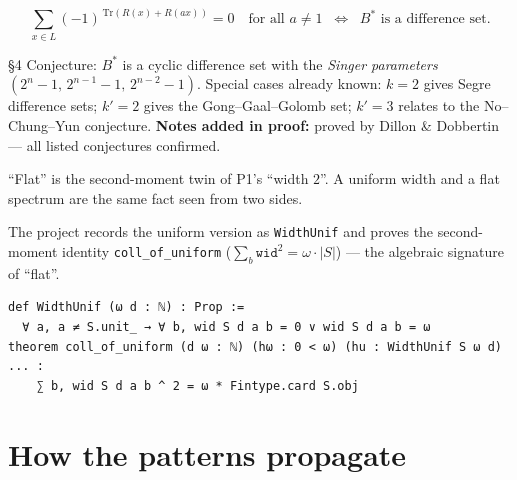 \documentclass[11pt]{article}
\begin{document}
\[
  \sum_{x\in L} (-1)^{\,\mathrm{Tr}(R(x)+R(ax))} = 0
  \quad\text{for all } a\ne 1
  \;\;\Longleftrightarrow\;\;
  B^{*}\text{ is a difference set.}
\]

\begin{center}
\end{center}

\begin{remarkbox}
{\S}4 Conjecture: $B^{*}$ is a cyclic difference set with the \emph{Singer
parameters} $(2^n-1,\,2^{n-1}-1,\,2^{n-2}-1)$. Special cases already known:
$k=2$ gives Segre difference sets; $k'=2$ gives the Gong--Gaal--Golomb set;
$k'=3$ relates to the No--Chung--Yun conjecture. \textbf{Notes added in proof:}
proved by Dillon \& Dobbertin --- all listed conjectures confirmed.
\end{remarkbox}

\begin{coolfact}
``Flat'' is the second-moment twin of P1's ``width $2$''. A uniform width and a
flat spectrum are the same fact seen from two sides.
\end{coolfact}

\begin{leanbox}
The project records the uniform version as \texttt{WidthUnif} and proves the
second-moment identity \texttt{coll\_of\_uniform}
($\sum_b \mathtt{wid}^2 = \omega\cdot|S|$) --- the algebraic signature of
``flat''.
\begin{lstlisting}
def WidthUnif (ω d : ℕ) : Prop :=
  ∀ a, a ≠ S.unit_ → ∀ b, wid S d a b = 0 ∨ wid S d a b = ω
theorem coll_of_uniform (d ω : ℕ) (hω : 0 < ω) (hu : WidthUnif S ω d) ... :
    ∑ b, wid S d a b ^ 2 = ω * Fintype.card S.obj
\end{lstlisting}
\end{leanbox}

\newpage
\section*{How the patterns propagate}
\end{document}
